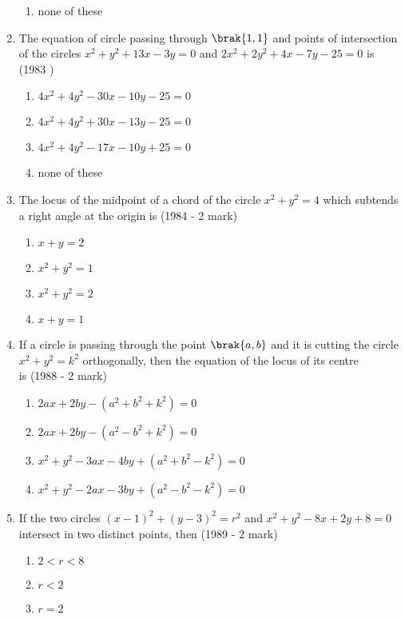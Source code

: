 \begin{enumerate}
\begin{multicols}{2}
\begin{enumerate}
    		\item none of these
    	\end{enumerate}
    \end{multicols}
    \item The equation of circle passing through $\brak{1, 1}$ and points of intersection of the circles $x^{2}+y^{2}+13x-3y=0$ and $2x^{2}+2y^{2}+4x-7y-25=0$ is
    \hfill {(1983 )}
    \begin{enumerate}
    	\item $4x^{2}+4y^{2}-30x-10y-25=0$
    	\item $4x^{2}+4y^{2}+30x-13y-25=0$
    	\item $4x^{2}+4y^{2}-17x-10y+25=0$
    	\item none of these
    \end{enumerate}
    \item The locus of the midpoint of a chord of the circle $x^{2}+y^{2}=4$ which subtends a right angle at the origin is \hfill {(1984 - 2 mark)}
    \begin{enumerate}
    	\item $x+y=2$
    	\item $x^{2}+y^{2}=1$
    	\item $x^{2}+y^{2}=2$
    	\item $x+y=1$
    \end{enumerate}
    \item If a circle is passing through the point $\brak{a, b}$ and it is cutting the circle $x^{2}+y^{2}=k^{2}$ orthogonally,  then the equation of the locus of its centre \\ is 
    \hfill {(1988 - 2 mark)}
    \begin{enumerate}
    	\item $2ax + 2by - (a^{2}+b^{2}+k^{2}) = 0$
    	\item $2ax + 2by - (a^{2}-b^{2}+k^{2}) = 0$
    	\item $x^{2} + y^{2}-3ax-4by+ (a^{2}+b^{2}-k^{2}) = 0$
    	\item $x^{2} + y^{2}-2ax-3by+ (a^{2}-b^{2}-k^{2}) = 0$
    \end{enumerate}
    \item If the two circles $(x-1)^{2} + (y-3)^{2} = r^{2}$ and $x^{2}+y^{2}-8x+2y+8=0$ intersect in two distinct points,  then \hfill {(1989 - 2 mark)} 
    \begin{enumerate}
    	\item $2<r<8$
    	\item $r<2$
    	\item $r=2$

\end{enumerate}
\end{enumerate}
